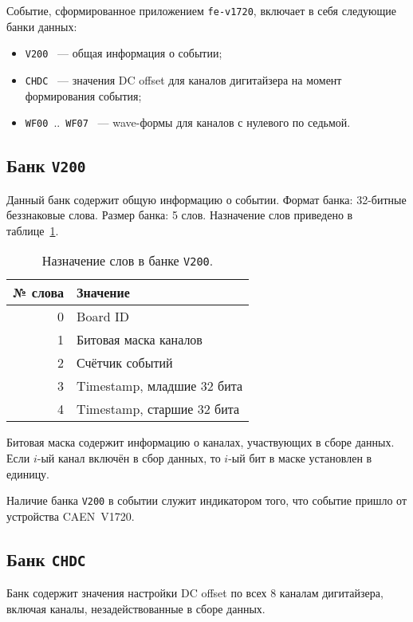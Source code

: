 \documentclass[12pt, a4paper]{article}
\newcommand{\BANK}[1]{{\tt #1}}
\newcommand{\APP}{{\tt fe-v1720}}
\newcommand{\DEVICE}{CAEN~V1720}
\begin{document}
Событие, сформированное приложением \APP{}, включает в себя следующие банки данных:

\begin{itemize}

\item \BANK{V200} ~--- общая информация о событии;
\item \BANK{CHDC} ~--- значения DC offset для каналов дигитайзера на момент формирования события;
\item \BANK{WF00}~..~\BANK{WF07} ~--- wave-формы для каналов с нулевого по седьмой.

\end{itemize}

\subsection{Банк \BANK{V200}}

Данный банк содержит общую информацию о событии. Формат банка: 32-битные беззнаковые слова. Размер банка: 5 слов. Назначение слов приведено в таблице~\ref{tab-info-bank}.

\begin{table}[h]
\centering
\begin{tabular}{rl}
\hline\hline
№ слова & Значение \\
\hline

0 & Board ID \\
1 & Битовая маска каналов \\
2 & Счётчик событий \\
3 & Timestamp, младшие 32 бита \\
4 & Timestamp, старшие 32 бита \\

\hline\hline
\end{tabular}
\caption{Назначение слов в банке \BANK{V200}.}
\label{tab-info-bank}
\end{table}

Битовая маска содержит информацию о каналах, участвующих в сборе данных. Если $i$-ый канал включён в сбор данных, то $i$-ый бит в маске установлен в единицу.

Наличие банка \BANK{V200} в событии служит индикатором того, что событие пришло от устройства \DEVICE{}.

\subsection{Банк \BANK{CHDC}}

Банк содержит значения настройки DC offset по всех 8 каналам дигитайзера, включая каналы, незадействованные в сборе данных.
\end{document}
